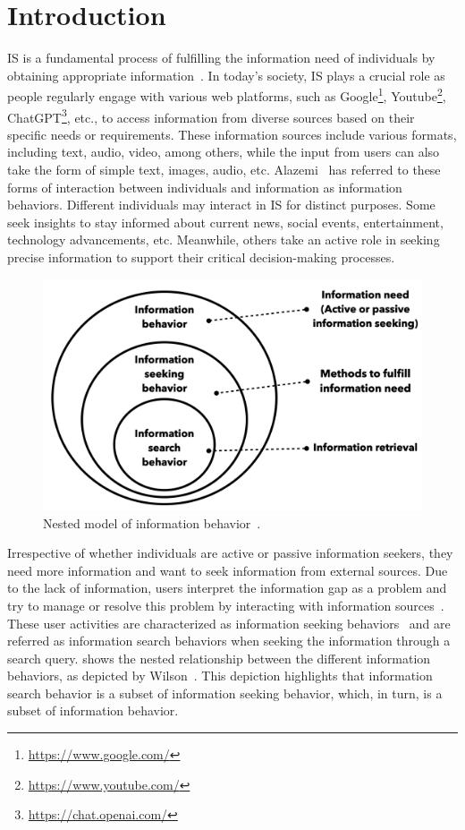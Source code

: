 
\chapter{Introduction}
 \ac{IS} is a fundamental process of fulfilling the information need of individuals by obtaining appropriate information~\cite{savolainen2016elaborating}. In today's society, \ac{IS} plays a crucial role as people regularly engage with various web platforms, such as Google\footnote{\url{https://www.google.com/}}, Youtube\footnote{\url{https://www.youtube.com/}},  ChatGPT\footnote{\url{https://chat.openai.com/}}, etc., to access information from diverse sources based on their specific needs or requirements. These information sources include various formats, including text, audio, video, among others, while the input from users can also take the form of simple text, images, audio, etc. Alazemi~\cite{Alazemi2015UsersIS} has referred to these forms of interaction between individuals and information as information behaviors. Different individuals may interact in \ac{IS} for distinct purposes. Some seek insights to stay informed about current news, social events, entertainment, technology advancements, etc. Meanwhile, others take an active role in seeking precise information to support their critical decision-making processes.

\begin{figure}[h]
	\centering
	\includegraphics[width=.6\textwidth]{images/thesis_images/information_behaviors.png}
	\caption{Nested model of information behavior~\cite{informationrModelsInformation}. \label{fig:information_behaviors}}
\end{figure} 

Irrespective of whether individuals are active or passive information seekers, they need more information and want to seek information from external sources. Due to the lack of information, users interpret the information gap as a problem and try to manage or resolve this problem by interacting with information sources~\cite{belkin1993interaction}. These user activities are characterized as information seeking behaviors~\cite{belkin1993interaction} and are referred as information search behaviors when seeking the information through a search query.  shows the nested relationship between the different information behaviors, as depicted by Wilson~\cite{informationrModelsInformation}. This depiction highlights that information search behavior is a subset of information seeking behavior, which, in turn, is a subset of information behavior.


